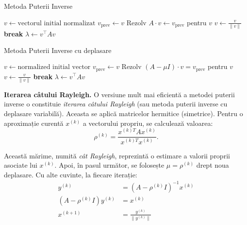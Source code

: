 \documentclass{exam}
\begin{document}
\begin{algorithm}
	\caption{Metoda Puterii Inverse}
	\begin{algorithmic}[1]
		\State \( v \gets \text{vectorul initial normalizat} \)
		\State \( v_{\text{prev}} \gets v \)
		\State Rezolv \( A \cdot v \gets v_{\text{prev}} \) pentru \( v \)
		\State \( v \gets \frac{v}{\| v \|} \)
		\State \textbf{break}
		\EndIf
		\EndFor
		\State \( \lambda \gets v^\top A v \)
	\end{algorithmic}
\end{algorithm}

\newpage
\begin{algorithm}
	\caption{Metoda Puterii Inverse cu deplasare}
	\begin{algorithmic}[1]
		\State \( v \gets \text{normalized initial vector} \)
		\State \( v_{\text{prev}} \gets v \)
		\State Rezolv \( (A - \mu I) \cdot v = v_{\text{prev}} \) pentru \( v \)
		\State \( v \gets \frac{v}{\| v \|} \)
		\State \textbf{break}
		\EndIf
		\EndFor
		\State \( \lambda \gets v^\top A v \)
	\end{algorithmic}
\end{algorithm}

\textbf{Iterarea câtului Rayleigh.} O versiune mult mai eficientă a metodei
puterii inverse o constituie \textit{iterarea câtului Rayleigh} (sau metoda
puterii inverse cu deplasare variabilă). Aceasta se aplică matricelor hermitice
(simetrice). Pentru o aproximație curentă $x^{(k)}$
a vectorului propriu, se calculează valoarea:
\begin{equation*}
	\rho^{(k)} = \frac{x^{(k) T} A x^{(k)}}{x^{(k) T} x^{(k)}}.
\end{equation*}

Această mărime, numită \textit{cât Rayleigh}, reprezintă o estimare a valorii
proprii asociate lui $x^{(k)}$. Apoi, în pasul următor, se folosește
$\mu = \rho^{(k)}$ drept noua deplasare. Cu alte cuvinte, la fiecare iterație:
\begin{align*}
	y^{(k)}                    & = (A - \rho^{(k)} I)^{-1} x^{(k)} \\
	(A - \rho^{(k)} I) y^{(k)} & = x^{(k)}                         \\
	x^{(k+1)}                  & = \frac{y^{(k)}}{\|y^{(k)}\|}     \\
\end{align*}
\end{document}
